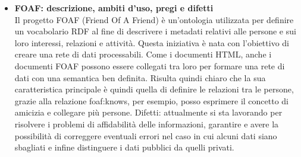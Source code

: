 \documentclass[10pt,                    %
               a4paper,                 %
               twoside,                 %
               openright,               %
               english,                 
               italian,                 
]{article}
\begin{document}
\begin{itemize}
\item \textbf{FOAF: descrizione, ambiti d'uso, pregi e difetti} \\
Il progetto FOAF (Friend Of A Friend) è un'ontologia utilizzata per definire un
vocabolario RDF al fine di descrivere i metadati relativi alle persone e sui loro
interessi, relazioni e attività. Questa iniziativa è nata con l'obiettivo di 
creare una rete di dati processabili. Come i documenti HTML, anche i documenti 
FOAF possono essere collegati tra loro per formare una rete di dati con una
semantica ben definita. Risulta quindi chiaro che la sua caratteristica principale 
è quindi quella di definire le relazioni tra le persone, grazie alla relazione 
foaf:knows, per esempio, posso esprimere il concetto di amicizia e collegare più
persone. Difetti: attualmente si sta lavorando per risolvere i problemi di 
affidabilità delle informazioni, garantire e avere la possibilità di correggere 
eventuali errori nel caso in cui alcuni dati siano sbagliati e infine distinguere 
i dati pubblici da quelli privati.


\end{itemize}
\end{document}
